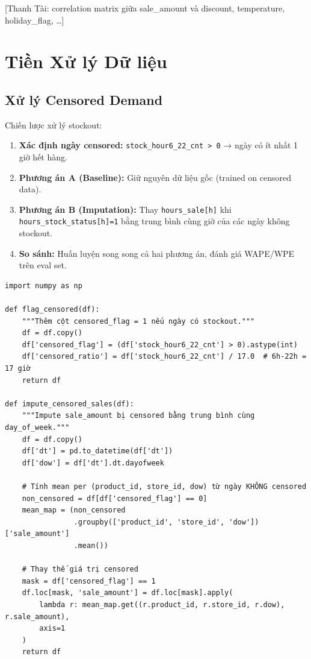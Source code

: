 \documentclass[12pt,a4paper]{report}
\begin{document}
[Thanh Tài: correlation matrix giữa sale\_amount và discount, temperature, holiday\_flag, \ldots]

\section{Tiền Xử lý Dữ liệu}

\subsection{Xử lý Censored Demand}

Chiến lược xử lý stockout:
\begin{enumerate}
    \item \textbf{Xác định ngày censored:} \texttt{stock\_hour6\_22\_cnt > 0} → ngày có ít nhất 1 giờ hết hàng.
    \item \textbf{Phương án A (Baseline):} Giữ nguyên dữ liệu gốc (trained on censored data).
    \item \textbf{Phương án B (Imputation):} Thay \texttt{hours\_sale[h]} khi \texttt{hours\_stock\_status[h]=1} bằng trung bình cùng giờ của các ngày không stockout.
    \item \textbf{So sánh:} Huấn luyện song song cả hai phương án, đánh giá WAPE/WPE trên eval set.
\end{enumerate}

\begin{lstlisting}[caption=Đánh dấu và xử lý censored demand]
import numpy as np

def flag_censored(df):
    """Thêm cột censored_flag = 1 nếu ngày có stockout."""
    df = df.copy()
    df['censored_flag'] = (df['stock_hour6_22_cnt'] > 0).astype(int)
    df['censored_ratio'] = df['stock_hour6_22_cnt'] / 17.0  # 6h-22h = 17 giờ
    return df

def impute_censored_sales(df):
    """Impute sale_amount bị censored bằng trung bình cùng day_of_week."""
    df = df.copy()
    df['dt'] = pd.to_datetime(df['dt'])
    df['dow'] = df['dt'].dt.dayofweek

    # Tính mean per (product_id, store_id, dow) từ ngày KHÔNG censored
    non_censored = df[df['censored_flag'] == 0]
    mean_map = (non_censored
                .groupby(['product_id', 'store_id', 'dow'])['sale_amount']
                .mean())

    # Thay thế giá trị censored
    mask = df['censored_flag'] == 1
    df.loc[mask, 'sale_amount'] = df.loc[mask].apply(
        lambda r: mean_map.get((r.product_id, r.store_id, r.dow), r.sale_amount),
        axis=1
    )
    return df
\end{lstlisting}
\end{document}
